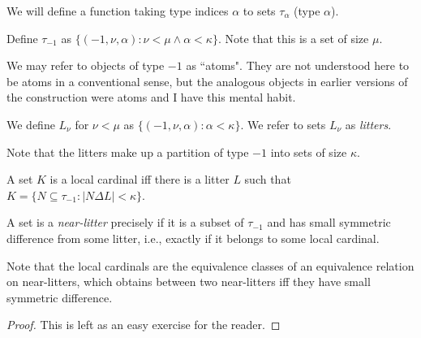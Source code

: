 We will define a function taking type indices $\alpha$ to sets $\tau_\alpha$ (type $\alpha$).

\begin{definition}
\label {def:type-minus-one}
\leanok
{}
Define $\tau_{-1}$ as  $\{(-1,\nu,\alpha):\nu<\mu \wedge \alpha<\kappa\}$.  Note that this is a set of size $\mu$.
\end{definition}

We may refer to objects of type $-1$ as ``atoms".  They are not understood here to be atoms in a conventional sense, but the analogous objects in earlier versions of the construction were atoms and I have this mental habit.

\begin{definition}
\label {def:litter}
\leanok
{}
We define $L_\nu$ for $\nu<\mu$ as $\{(-1,\nu,\alpha):\alpha<\kappa\}$.  We refer to sets $L_\nu$ as {\em litters\/}.

Note that the litters make up a partition of type $-1$ into sets of size $\kappa$.
\end{definition}

\begin{definition}
\label {def:local-cardinal}
A set $K$ is a local cardinal iff there is a litter $L$ such that $K=\{N \subseteq \tau_{-1}:|N \Delta L|<\kappa\}$.
\end{definition}

\begin{definition}
\label {def:near-litter}
\leanok
{}
A set is a {\em near-litter} precisely if it is a subset of $\tau_{-1}$ and has small symmetric difference from some litter, i.e., exactly if it belongs to some local cardinal.
\end{definition}

\begin{lemma}
\label {lem:small-diff-equiv}
\leanok
{}
Note that the local cardinals are the equivalence classes of an equivalence relation on near-litters, which obtains between two near-litters iff they have small symmetric difference.
\end{lemma}

\begin{proof}
\leanok
This is left as an easy exercise for the reader.
\end{proof}

